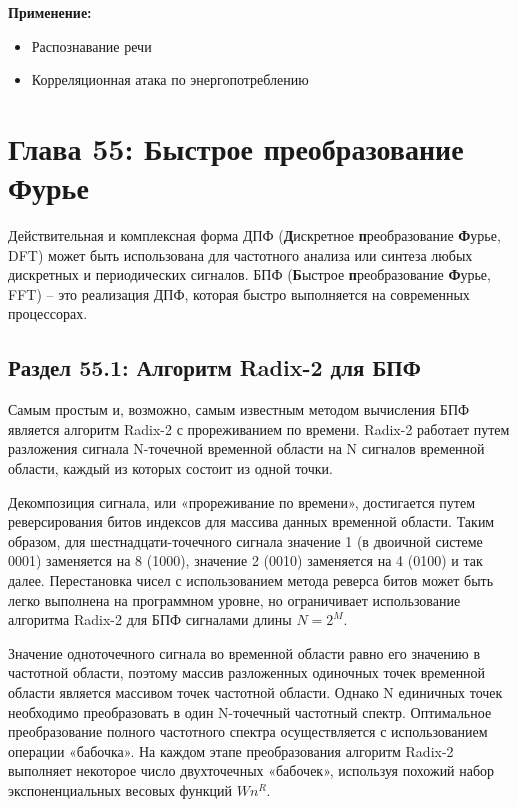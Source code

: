 \vspace{\baselineskip}
\vspace{-0.1cm}
\textbf{Применение:}

\vspace{-0.1cm}
\begin{itemize}
  \item	Распознавание речи
  \vspace{-0.4cm}
  \item	Корреляционная атака по энергопотреблению
\end{itemize}

\chapter*{Глава 55: Быстрое преобразование Фурье}

\vspace{-0.3cm}
Действительная и комплексная форма ДПФ (\textbf{Д}искретное \textbf{п}реобразование \textbf{Ф}урье, DFT) может быть использована для частотного анализа или синтеза любых дискретных и периодических сигналов. БПФ (\textbf{Б}ыстрое \textbf{п}реобразование \textbf{Ф}урье, FFT) – это реализация ДПФ, которая быстро выполняется на современных процессорах.

\section*{Раздел 55.1: Алгоритм Radix-2 для БПФ}

Самым простым и, возможно, самым известным методом вычисления БПФ является алгоритм Radix-2 с прореживанием по времени. Radix-2 работает путем разложения сигнала N-точечной временной области на N сигналов временной области, каждый из которых состоит из одной точки.


Декомпозиция сигнала, или «прореживание по времени», достигается путем реверсирования битов индексов для массива данных временной области. Таким образом, для шестнадцати-точечного сигнала значение 1 (в двоичной системе 0001) заменяется на 8 (1000), значение 2 (0010) заменяется на 4 (0100) и так далее. Перестановка чисел с использованием метода реверса битов может быть легко выполнена на программном уровне, но ограничивает использование алгоритма Radix-2 для БПФ сигналами длины $N=2^M$.

\vspace{\baselineskip}
Значение одноточечного сигнала во временной области равно его значению в частотной области, поэтому массив разложенных одиночных точек временной области является массивом точек частотной области. Однако N единичных точек необходимо преобразовать в один N-точечный частотный спектр. Оптимальное преобразование полного частотного спектра осуществляется с использованием операции «бабочка». На каждом этапе преобразования алгоритм Radix-2 выполняет некоторое число двухточечных «бабочек», используя похожий набор экспоненциальных весовых функций $Wn^R$.

